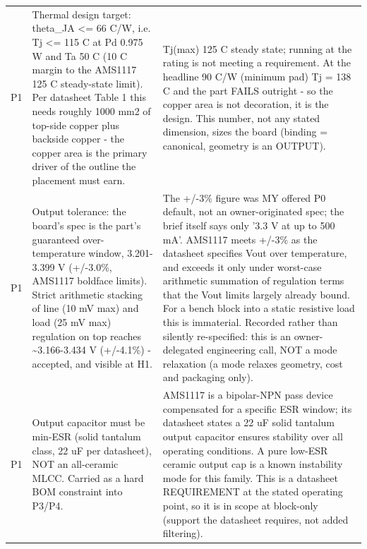 \documentclass[11pt,a4paper]{article}
\begin{document}
{\begin{longtable}{lp{5.2cm}p{7.2cm}}
P1 & Thermal design target: theta\_JA \textless{}= 66 C/W, i.e. Tj \textless{}= 115 C at Pd 0.975 W and Ta 50 C (10 C margin to the AMS1117 125 C steady-state limit). Per datasheet Table 1 this needs roughly 1000 mm2 of top-side copper plus backside copper - the copper area is the primary driver of the outline the placement must earn. & Tj(max) 125 C steady state; running at the rating is not meeting a requirement. At the headline 90 C/W (minimum pad) Tj = 138 C and the part FAILS outright - so the copper area is not decoration, it is the design. This number, not any stated dimension, sizes the board (binding = canonical, geometry is an OUTPUT). \\
P1 & Output tolerance: the board's spec is the part's guaranteed over-temperature window, 3.201-3.399 V (+/-3.0\%, AMS1117 boldface limits). Strict arithmetic stacking of line (10 mV max) and load (25 mV max) regulation on top reaches \textasciitilde{}3.166-3.434 V (+/-4.1\%) - accepted, and visible at H1. & The +/-3\% figure was MY offered P0 default, not an owner-originated spec; the brief itself says only '3.3 V at up to 500 mA'. AMS1117 meets +/-3\% as the datasheet specifies Vout over temperature, and exceeds it only under worst-case arithmetic summation of regulation terms that the Vout limits largely already bound. For a bench block into a static resistive load this is immaterial. Recorded rather than silently re-specified: this is an owner-delegated engineering call, NOT a mode relaxation (a mode relaxes geometry, cost and packaging only). \\
P1 & Output capacitor must be min-ESR (solid tantalum class, 22 uF per datasheet), NOT an all-ceramic MLCC. Carried as a hard BOM constraint into P3/P4. & AMS1117 is a bipolar-NPN pass device compensated for a specific ESR window; its datasheet states a 22 uF solid tantalum output capacitor ensures stability over all operating conditions. A pure low-ESR ceramic output cap is a known instability mode for this family. This is a datasheet REQUIREMENT at the stated operating point, so it is in scope at block-only (support the datasheet requires, not added filtering). \\

\end{longtable}}
\end{document}
